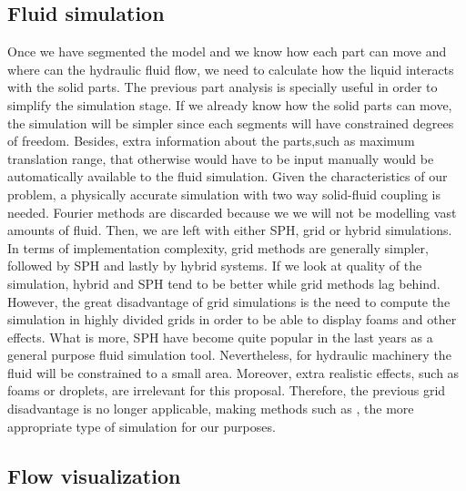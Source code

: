 
\subsection{Fluid simulation}

Once we have segmented the model and we know how each part can move and where can the hydraulic fluid flow, we need to calculate how the liquid interacts with the solid parts.
The previous part analysis is specially useful in order to simplify the simulation stage.
If we already know how the solid parts can move, the simulation will be simpler since each segments will have constrained degrees of freedom.
Besides, extra information about the parts,such as maximum translation range, that otherwise would have to be input manually would be automatically available to the fluid simulation.
Given the characteristics of our problem, a physically accurate simulation with two way solid-fluid coupling is needed.
Fourier methods are discarded because we we will not be modelling vast amounts of fluid.
Then, we are left with either SPH, grid or hybrid simulations.
In terms of implementation complexity, grid methods are generally simpler, followed by SPH and lastly by hybrid systems.
If we look at quality of the simulation, hybrid and SPH tend to be better while grid methods lag behind.
However, the great disadvantage of grid simulations is the need to compute the simulation in highly divided grids in order to be able to display foams and other effects.
What is more, SPH have become quite popular in the last years as a general purpose fluid simulation tool.
Nevertheless, for hydraulic machinery the fluid will be constrained to a small area.
Moreover, extra realistic effects, such as foams or droplets, are irrelevant for this proposal.
Therefore, the previous grid disadvantage is no longer applicable, making methods such as \cite{Carlson2004}, the more appropriate type of simulation for our purposes.


\subsection{Flow visualization}

